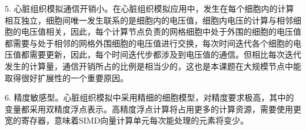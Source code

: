\begin{compactitem}
\item[5.]
心脏组织模拟通信开销小。在心脏组织模拟应用中，发生在每个细胞内的计算相互独立，细胞间唯一发生联系的是细胞内的电压值，细胞内电压的计算与相邻细胞的电压值相关，因此，每个计算节点负责的网格细胞中处于外围的细胞的电压值都需要与处于相邻的网格外围细胞的电压值进行交换，每次时间迭代各个细胞的电压值都需要更新，因此，每个时间迭代步都涉及到电压值的通信。但相比每次迭代发生的计算量，通信开销所占的比例是相当少的，这也是本课题在大规模节点中能取得很好扩展性的一个重要原因。

\item[6.]
精度敏感型。心脏组织模拟中采用精细的细胞模型，对精度要求极高，其中的变量都采用双精度浮点表示。高精度浮点计算将占用更多的计算资源，需要使用更宽的寄存器，意味着SIMD向量计算单元每次能处理的元素将变少。

\end{compactitem}

